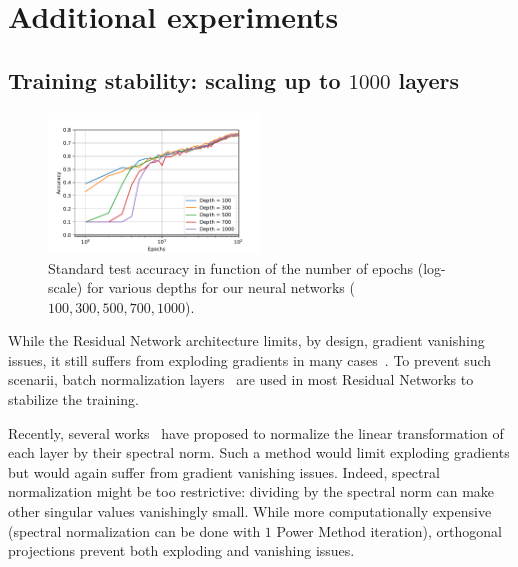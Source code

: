 



\section{Additional experiments}
\label{app:xp-supp}

\subsection{Training stability: scaling up to $1000$ layers}

\begin{figure}[h]
    \centering
    \includegraphics[width=0.5\textwidth]{sections/4_certification/images/final_cifar10_veryverydeep.pdf}
    \caption{Standard test accuracy in function of the number of epochs (log-scale) for various depths for our neural networks ($100,300,500,700,1000$).}
    \label{fig:verydeep}
\end{figure}

While the Residual Network architecture limits, by design, gradient vanishing issues, it still suffers from exploding gradients in many cases~\citep{hayou2021stable}.
To prevent such scenarii, batch normalization layers~\citep{ioffe2015batch} are used in most Residual Networks to stabilize the training.

Recently, several works~\citep{miyato2018spectral,farnia2018generalizable} have proposed to normalize the linear transformation of each layer by their spectral norm.
Such a method would limit exploding gradients but would again suffer from gradient vanishing issues.
Indeed, spectral normalization might be too restrictive: dividing by the spectral norm can make other singular values vanishingly
small.
While more computationally expensive (spectral normalization can be done with $1$ Power Method iteration), orthogonal projections prevent both exploding and vanishing issues. 

